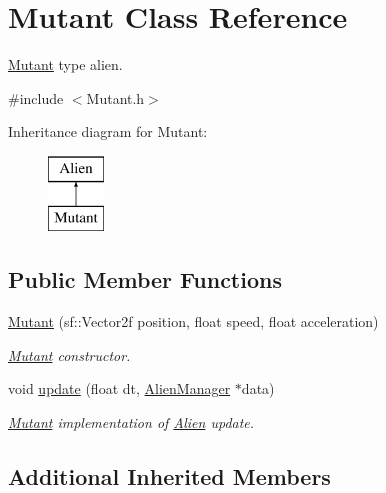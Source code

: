 \hypertarget{class_mutant}{}\section{Mutant Class Reference}
\label{class_mutant}


\hyperlink{class_mutant}{Mutant} type alien.  




{\ttfamily \#include $<$Mutant.\+h$>$}

Inheritance diagram for Mutant\+:\begin{figure}[H]
\begin{center}
\leavevmode
\includegraphics[height=2.000000cm]{class_mutant}
\end{center}
\end{figure}
\subsection*{Public Member Functions}
\begin{DoxyCompactItemize}
\item 
\mbox{\label{class_mutant_ab0050fd2b81983b932404a0f83289198}} 
\hyperlink{class_mutant_ab0050fd2b81983b932404a0f83289198}{Mutant} (sf\+::\+Vector2f position, float speed, float acceleration)
\begin{DoxyCompactList}\small\item\em \hyperlink{class_mutant}{Mutant} constructor. \end{DoxyCompactList}\item 
void \hyperlink{class_mutant_a38e6f65661b8f81e58f5e06b4d546457}{update} (float dt, \hyperlink{class_alien_manager}{Alien\+Manager} $\ast$data)
\begin{DoxyCompactList}\small\item\em \hyperlink{class_mutant}{Mutant} implementation of \hyperlink{class_alien}{Alien} update. \end{DoxyCompactList}\end{DoxyCompactItemize}
\subsection*{Additional Inherited Members}


